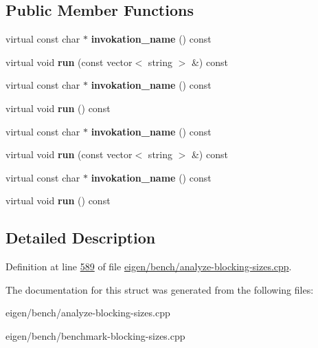\subsection*{Public Member Functions}
\begin{DoxyCompactItemize}
\item 
\mbox{\label{structaction__t_ae335a33d5bb11b2664f58fc1b6821868}} 
virtual const char $\ast$ {\bfseries invokation\+\_\+name} () const
\item 
\mbox{\label{structaction__t_ab9af3645fd631a716d8cfed16bd34a9d}} 
virtual void {\bfseries run} (const vector$<$ string $>$ \&) const
\item 
\mbox{\label{structaction__t_ae335a33d5bb11b2664f58fc1b6821868}} 
virtual const char $\ast$ {\bfseries invokation\+\_\+name} () const
\item 
\mbox{\label{structaction__t_a72556eedf28ab21ae2c0c948fe735fe5}} 
virtual void {\bfseries run} () const
\item 
\mbox{\label{structaction__t_ae335a33d5bb11b2664f58fc1b6821868}} 
virtual const char $\ast$ {\bfseries invokation\+\_\+name} () const
\item 
\mbox{\label{structaction__t_ab9af3645fd631a716d8cfed16bd34a9d}} 
virtual void {\bfseries run} (const vector$<$ string $>$ \&) const
\item 
\mbox{\label{structaction__t_ae335a33d5bb11b2664f58fc1b6821868}} 
virtual const char $\ast$ {\bfseries invokation\+\_\+name} () const
\item 
\mbox{\label{structaction__t_a72556eedf28ab21ae2c0c948fe735fe5}} 
virtual void {\bfseries run} () const
\end{DoxyCompactItemize}


\subsection{Detailed Description}


Definition at line \hyperlink{eigen_2bench_2analyze-blocking-sizes_8cpp_source_l00589}{589} of file \hyperlink{eigen_2bench_2analyze-blocking-sizes_8cpp_source}{eigen/bench/analyze-\/blocking-\/sizes.\+cpp}.



The documentation for this struct was generated from the following files\+:\begin{DoxyCompactItemize}
\item 
eigen/bench/analyze-\/blocking-\/sizes.\+cpp\item 
eigen/bench/benchmark-\/blocking-\/sizes.\+cpp\end{DoxyCompactItemize}

